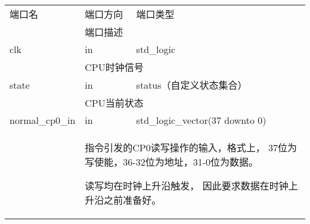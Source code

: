         \begin{tabularx}{\textwidth}{lll}
            \toprule
            端口名          & 端口方向  & 端口类型 \\
            \cmidrule(l){2-3}
            &
            \multicolumn{2}{X}{端口描述} \\
            \midrule
            clk             & in        & std\_logic \\
            \cmidrule(l){2-3}
            &
            \multicolumn{2}{X}{
                CPU时钟信号
            } \\
            \midrule
            state           & in        & status（自定义状态集合） \\
            \cmidrule(l){2-3}
            &
            \multicolumn{2}{X}{
                CPU当前状态
            } \\
            \midrule
	        normal\_cp0\_in & in        & std\_logic\_vector(37 downto 0) \\
            \cmidrule(l){2-3}
            &
            \multicolumn{2}{X}{
	            指令引发的CP0读写操作的输入，格式上，%
                37位为写使能，36-32位为地址，31-0位为数据。

	            读写均在时钟上升沿触发，%
                因此要求数据在时钟上升沿之前准备好。

}
\end{tabularx}
